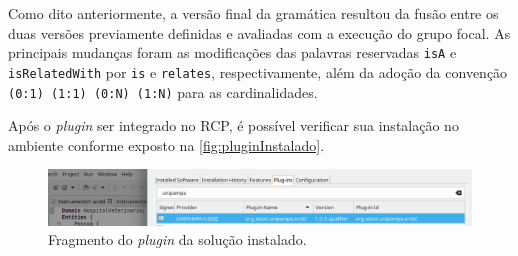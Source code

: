 Como dito anteriormente, a versão final da gramática resultou da fusão entre os duas versões previamente definidas e avaliadas com a execução do grupo focal.
As principais mudanças foram as modificações das palavras reservadas \texttt{isA} e \texttt{isRelatedWith} por \texttt{is} e \texttt{relates}, respectivamente, além da adoção da convenção \texttt{(0:1) (1:1) (0:N) (1:N)} para as cardinalidades.



	






    

Após o \textit{plugin} ser integrado no \ac{RCP}, é possível verificar sua instalação no ambiente conforme exposto na \autoref{fig:pluginInstalado}.

\begin{figure}[!htb]
    \centering
    \caption{Fragmento do \textit{plugin} da solução instalado.}
    \label{fig:pluginInstalado}
    \includegraphics[width=\textwidth]{img/PluginInstalado}
\end{figure}


